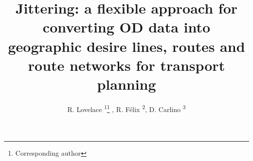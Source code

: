 \documentclass{isprs} %
\begin{document}
\title{Jittering: a flexible approach for converting OD data into geographic desire lines, routes and route networks for transport planning}
\date{}


\author{
R. Lovelace \textsuperscript{1}\thanks{Corresponding author}
, R. Félix \textsuperscript{2}, 
D. Carlino \textsuperscript{3}
}

\address{
\textsuperscript{1} Institute for Transport Studies, University of Leeds, UK - r.lovelace@leeds.ac.uk \\
\textsuperscript{2} CERIS, Instituto Superior Técnico, University of Lisbon, Portugal - rosamfelix@tecnico.ulisboa.pt \\
\textsuperscript{3} Alan Turing Institute, UK - dcarlino@turing.ac.uk
}



\icwg{}   %
\end{document}
